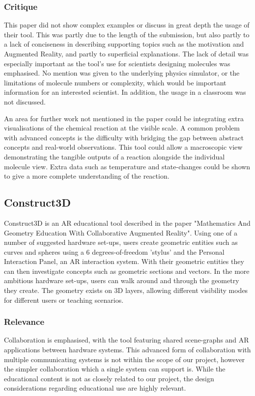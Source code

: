 \subsubsection{Critique}
This paper did not show complex examples or discuss in great depth the usage of their tool. This was partly due to the length of the submission, but also partly to a lack of conciseness in describing supporting topics such as the motivation and Augmented Reality, and partly to superficial explanations. The lack of detail was especially important as the tool's use for scientists designing molecules was emphasised. No mention was given to the underlying physics simulator, or the limitations of molecule numbers or complexity, which would be important information for an interested scientist. In addition, the usage in a classroom was not discussed.

An area for further work not mentioned in the paper could be integrating extra visualisations of the chemical reaction at the visible scale. A common problem with advanced concepts is the difficulty with bridging the gap between abstract concepts and real-world observations. This tool could allow a macroscopic view demonstrating the tangible outputs of a reaction alongside the individual molecule view. Extra data such as temperature and state-changes could be shown to give a more complete understanding of the reaction.

\subsection{Construct3D}
Construct3D is an AR educational tool described in the paper "Mathematics And Geometry Education With Collaborative Augmented Reality"\cite{Kaufmann03}. Using one of a number of suggested hardware set-ups, users create geometric entities such as curves and spheres using a 6 degrees-of-freedom 'stylus' and the Personal Interaction Panel, an AR interaction system\cite{szal97}. With their geometric entities they can then investigate concepts such as geometric sections and vectors. In the more ambitious hardware set-ups, users can walk around and through the geometry they create. The geometry exists on 3D layers, allowing different visibility modes for different users or teaching scenarios.

\subsubsection{Relevance}
Collaboration is emphasised, with the tool featuring shared scene-graphs and AR applications between hardware systems. This advanced form of collaboration with multiple communicating systems is not within the scope of our project, however the simpler collaboration which a single system can support is. While the educational content is not as closely related to our project, the design considerations regarding educational use are highly relevant.

